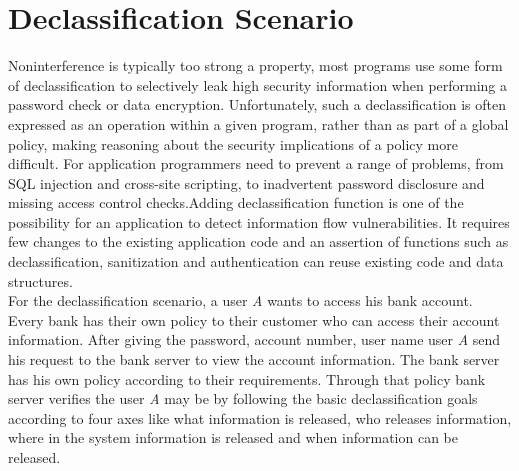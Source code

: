 \section{Declassification Scenario}
 Noninterference is typically
 too strong a property, most programs use some form of declassification to selectively leak high security information when performing a password check or data encryption. Unfortunately, such  a declassification is often expressed as an operation within a given  program, rather than as part of a global policy, making reasoning about the security implications of a policy more difficult. For application programmers need to prevent a range
 of problems, from SQL injection and cross-site scripting, to inadvertent password disclosure and missing access control checks.Adding declassification function is one of the possibility for an application to detect information flow vulnerabilities. It requires few changes to the existing application code and an assertion of functions such as declassification, sanitization and authentication can reuse existing code and data structures. \\
 
 For the declassification scenario, a user \emph{A} wants to access his bank account. Every bank has their own policy to their customer who can access their account information. After giving the password, account number, user name user \emph{A} send his request to the bank server to view the account information. The bank server has his own policy according to their requirements. Through that policy bank server verifies the user \emph{A} may be by following the basic declassification goals according to four axes like what information is released,
 who releases information, where in the system information is released and when information can be released.  \\
 
